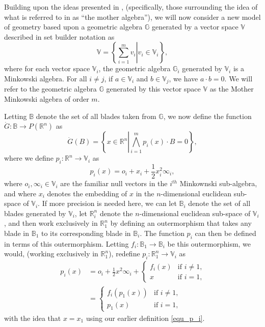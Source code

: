 \documentclass{birkjour}
\theoremstyle{definition}
\theoremstyle{remark}
\numberwithin{equation}{section}
\newcommand{\R}{\mathbb{R}}
\newcommand{\B}{\mathbb{B}}
\newcommand{\G}{\mathbb{G}}
\newcommand{\V}{\mathbb{V}}
\newcommand{\Gd}{\dot{G}}
\newcommand{\nvai}{\infty}
\newcommand{\nvao}{o}
\begin{document}
Building upon the ideas presented in \cite{DoranHestenes93}, (specifically,
those surrounding the idea of what is referred to in \cite{DoranHestenes93}
as ``the mother algebra''), we will now consider
a new model of geometry based upon a geometric algebra $\G$
generated by a vector space $\V$ described in set builder notation as
\begin{equation*}
\V = \left\{\left.\sum_{i=1}^m v_i\right|v_i\in\V_i\right\},
\end{equation*}
where for each vector space $\V_i$, the geometric algebra $\G_i$ generated by $\V_i$
is a Minkowski algebra.  For all $i\neq j$, if $a\in\V_i$
and $b\in\V_j$, we have $a\cdot b=0$.  We will refer to the geometric algebra $\G$
generated by this vector space $\V$ as the Mother Minkowski algebra of order $m$.

Letting $\B$ denote the set
of all blades taken from $\G$, we now define the function $\Gd:\B\to P(\R^n)$ as
\begin{equation}\label{equ_Gd}
\Gd(B) = \left\{x\in\R^n\left|\bigwedge_{i=1}^m p_i(x)\cdot B=0\right\}\right.,
\end{equation}
where we define $p_i:\R^n\to\V_i$ as
\begin{equation}\label{equ_p_i}
p_i(x) = \nvao_i + x_i + \frac{1}{2}x_i^2\nvai_i,
\end{equation}
where $\nvao_i,\nvai_i\in\V_i$ are the familiar null vectors in the $i^{th}$ Minkownski sub-algebra,
and where $x_i$ denotes the embedding
of $x$ in the $n$-dimensional euclidean sub-space of $\V_i$.  If more precision is needed here,
we can let $\B_i$ denote the set of all blades generated by $\V_i$,
let $\R_i^n$ denote the $n$-dimensional euclidean sub-space of $\V_i$, and then
work exclusively in $\R_1^n$ by defining an outermorphism that takes any blade in $\B_1$
to its corresponding blade in $\B_i$.  The function $p_i$ can then be defined in terms
of this outermorphism.  Letting $f_i:\B_1\to\B_i$ be this outermorphism,
we would, (working exclusively in $\R_1^n$), redefine $p_i:\R_1^n\to\V_i$ as
\begin{align*}
p_i(x) &= \nvao_i + \frac{1}{2}x^2\nvai_i + \left\{\begin{array}{ll}
f_i(x) & \mbox{if $i\neq 1$,} \\
x & \mbox{if $i = 1$,}
\end{array}\right. \\
&= \left\{\begin{array}{ll}
f_i(p_1(x)) & \mbox{if $i\neq 1$,} \\
p_1(x) & \mbox{if $i=1$,}
\end{array}\right.
\end{align*}
with the idea that $x=x_1$ using our earlier definition \eqref{equ_p_i}.
\end{document}
